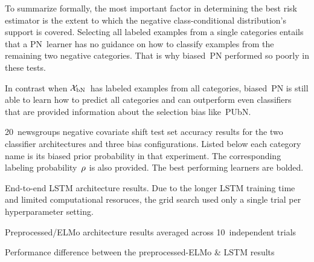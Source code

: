 To summarize formally, the most important factor in determining the best risk estimator is the extent to which the negative class-conditional distribution's support is covered.  Selecting all labeled examples from a single categories entails that a PN~learner has no guidance on how to classify examples from the remaining two negative categories.  That is why biased~PN performed so poorly in these tests.

In contrast when $\mathcal{X}_{\textnormal{bN}}$~has labeled examples from all categories, biased~PN is still able to learn how to predict all categories and can outperform even classifiers that are provided information about the selection bias like~PUbN.

\begin{table}[t]
  \caption{20~newsgroups negative covariate shift test set accuracy results for the two classifier architectures and three bias configurations. Listed below each category name is its biased prior probability in that experiment. The corresponding labeling probability~$\rho$ is also provided. The best performing learners are bolded.}\label{tab:ExperimentalResults}
  \begin{subtable}[t]{\textwidth}
    \centering
    \caption{End-to-end LSTM architecture results. Due to the longer LSTM training time and limited computational resoruces, the grid search used only a single trial per hyperparameter setting.}\label{tab:ExperimentalResults:LSTM}
    
  \end{subtable}

  \begin{subtable}[t]{\textwidth}
    \centering
    \caption{Preprocessed\-/ELMo architecture results averaged across 10~independent trials}\label{tab:ExperimentalResults:ELMo}
    
  \end{subtable}

  \begin{subtable}[t]{\textwidth}
    \centering
    \caption{Performance difference between the preprocessed-ELMo \& LSTM results}\label{tab:ExperimentalResults:Comparison}
    
  \end{subtable}
\end{table}
